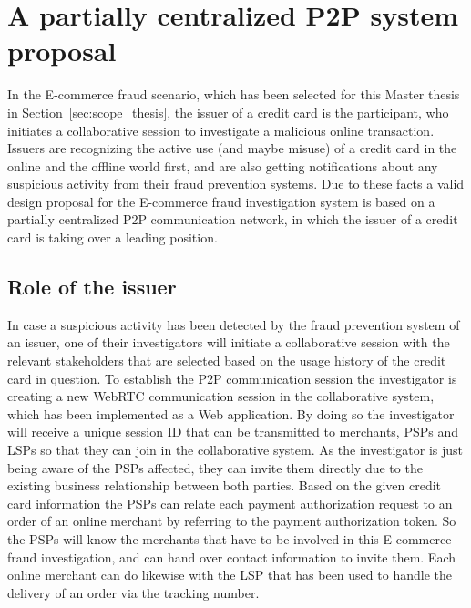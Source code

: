 
\section{A partially centralized \gls{P2P} system proposal}
\label{sec:p2p_partially_centralized_system}

In the \gls{E-commerce} fraud scenario, which has been selected for this Master thesis in Section~\ref{sec:scope_thesis}, the issuer of a credit card is the participant, who initiates a collaborative session to investigate a malicious online transaction. Issuers are recognizing the active use (and maybe misuse) of a credit card in the online and the offline world first, and are also getting notifications about any suspicious activity from their fraud prevention systems. Due to these facts a valid design proposal for the \gls{E-commerce} fraud investigation system is based on a partially centralized \gls{P2P} communication network, in which the issuer of a credit card is taking over a leading position.

\subsection{Role of the issuer}
\label{subsec:p2p_partially_issuer_collecting}

In case a suspicious activity has been detected by the fraud prevention system of an issuer, one of their investigators will initiate a collaborative session with the relevant stakeholders that are selected based on the usage history of the credit card in question. To establish the \gls{P2P} communication session the investigator is creating a new \gls{WebRTC} communication session in the collaborative system, which has been implemented as a Web application. By doing so the investigator will receive a unique session ID that can be transmitted to merchants, \gls{PSP}s and \gls{LSP}s so that they can join in the collaborative system. As the investigator is just being aware of the \gls{PSP}s affected, they can invite them directly due to the existing business relationship between both parties. Based on the given credit card information the \gls{PSP}s can relate each payment authorization request to an order of an online merchant by referring to the payment authorization token. So the \gls{PSP}s will know the merchants that have to be involved in this \gls{E-commerce} fraud investigation, and can hand over contact information to invite them. Each online merchant can do likewise with the \gls{LSP} that has been used to handle the delivery of an order via the tracking number. \\

